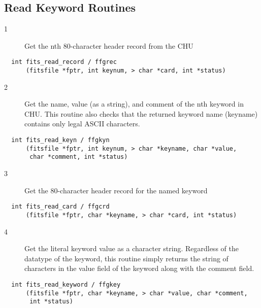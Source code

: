 \subsection{ Read Keyword Routines \label{FFGREC}}


\begin{description}
\item[1 ] Get the nth 80-character header record from the CHU
\end{description}

\begin{verbatim}
  int fits_read_record / ffgrec
      (fitsfile *fptr, int keynum, > char *card, int *status)
\end{verbatim}

\begin{description}
\item[2 ] Get the name, value (as a string), and comment of the nth keyword in CHU.
    This routine also checks that the returned keyword name (keyname) contains
   only legal ASCII characters.
\end{description}

\begin{verbatim}
  int fits_read_keyn / ffgkyn
      (fitsfile *fptr, int keynum, > char *keyname, char *value,
       char *comment, int *status)
\end{verbatim}

\begin{description}
\item[3 ] Get the 80-character header record for the named keyword
\end{description}

\begin{verbatim}
  int fits_read_card / ffgcrd
      (fitsfile *fptr, char *keyname, > char *card, int *status)
\end{verbatim}

\begin{description}
\item[4 ]  Get the literal keyword value as a character string.  Regardless
     of the datatype of the keyword, this routine simply returns the
     string of characters in the value field of the keyword along with
    the comment field.
\end{description}

\begin{verbatim}
  int fits_read_keyword / ffgkey
      (fitsfile *fptr, char *keyname, > char *value, char *comment,
       int *status)
\end{verbatim}

